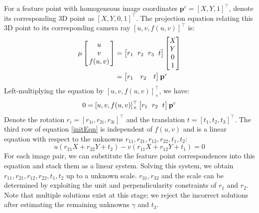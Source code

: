 \documentclass{report}
\begin{document}
For a feature point with homogeneous image coordinates $\mathbf{p}^c = [X, Y, 1]^\top$, denote its corresponding 3D point as $[X, Y, 0, 1]^\top$. The projection equation relating this 3D point to its corresponding camera ray $[u, v, f(u, v)]^\top$ is: 
\begin{align}
\arraycolsep=1.5pt%
\mu \begin{bmatrix}
	\begin{array}{c}
	u \\ v \\ f(u, v)
	\end{array}
\end{bmatrix}
&=
\arraycolsep=1.5pt%
\begin{bmatrix}
	r_1 && r_2 && r_3 && t
\end{bmatrix}
\begin{bmatrix}
	X \\ Y \\ 0 \\ 1
\end{bmatrix}\\
&= \begin{bmatrix}
	r_1 & r_2 & t
	\end{bmatrix} \mathbf{p}^c
\end{align}
Left-multiplying the equation by $[u, v, f(u, v)]^\top_\times$, we have: 
\begin{equation}
\arraycolsep=1.5pt%
0 = [u, v, f(u, v)]^\top_\times
\begin{bmatrix}
	r_1 && r_2 && t
\end{bmatrix} \mathbf{p}^c
\label{initEqn}
\end{equation}
Denote the rotation $r_i = [r_{1i}, r_{2i}, r_{3i}]^\top$ and the translation $t = [t_1, t_2, t_3]^\top$. The third row of equation \ref{initEqn} is independent of $f(u, v)$ and is a linear equation with respect to the unknowns $r_{11}, r_{21}, r_{12}, r_{22}, t_1, t_2$:
\begin{equation}
u (r_{21} X + r_{22} Y + t_2) - v (r_{11} X + r_{12} Y + t_1) = 0
\end{equation}
For each image pair, we can substitute the feature point correspondences into this equation and stack them as a linear system. Solving this system, we obtain $r_{11}, r_{21}, r_{12}, r_{22}, t_1, t_2$ up to a unknown scale. $r_{31}, r_{32}$ and the scale can be determined by exploiting the unit and perpendicularity constraints of $r_1$ and $r_2$. Note that multiple solutions exist at this stage; we reject the incorrect solutions after estimating the remaining unknowns $\gamma$ and $t_3$. 
\end{document}

